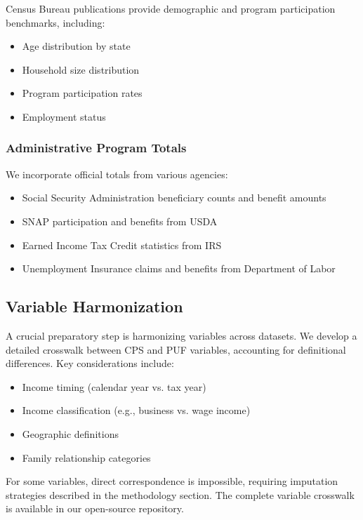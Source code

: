 Census Bureau publications provide demographic and program participation benchmarks, including:
\begin{itemize}
    \item Age distribution by state
    \item Household size distribution
    \item Program participation rates
    \item Employment status
\end{itemize}

\subsubsection{Administrative Program Totals}

We incorporate official totals from various agencies:
\begin{itemize}
    \item Social Security Administration beneficiary counts and benefit amounts
    \item SNAP participation and benefits from USDA
    \item Earned Income Tax Credit statistics from IRS
    \item Unemployment Insurance claims and benefits from Department of Labor
\end{itemize}

\subsection{Variable Harmonization}

A crucial preparatory step is harmonizing variables across datasets. We develop a detailed crosswalk between CPS and PUF variables, accounting for definitional differences. Key considerations include:
\begin{itemize}
    \item Income timing (calendar year vs. tax year)
    \item Income classification (e.g., business vs. wage income)
    \item Geographic definitions
    \item Family relationship categories
\end{itemize}

For some variables, direct correspondence is impossible, requiring imputation strategies described in the methodology section. The complete variable crosswalk is available in our open-source repository.